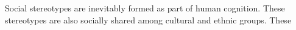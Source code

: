 Social stereotypes are inevitably formed as part of human cognition. These stereotypes are also socially shared among cultural and ethnic groups. These 